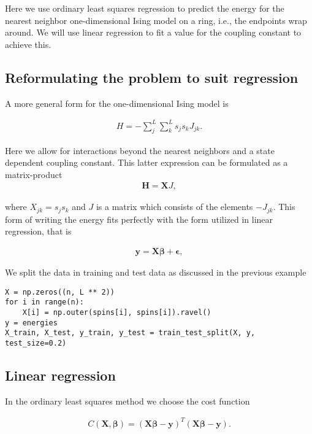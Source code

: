 \documentclass[%
oneside,                 %
final,                   %
10pt]{article}
\begin{document}
Here we use ordinary least squares
regression to predict the energy for the nearest neighbor
one-dimensional Ising model on a ring, i.e., the endpoints wrap
around. We will use linear regression to fit a value for
the coupling constant to achieve this.

\subsection*{Reformulating the problem to suit regression}

A more general form for the one-dimensional Ising model is

\begin{align}
    H = - \sum_j^L \sum_k^L s_j s_k J_{jk}.
\end{align}

Here we allow for interactions beyond the nearest neighbors and a state dependent
coupling constant. This latter expression can be formulated as
a matrix-product
\begin{align}
    \bm{H} = \bm{X} J,
\end{align}

where $X_{jk} = s_j s_k$ and $J$ is a matrix which consists of the
elements $-J_{jk}$. This form of writing the energy fits perfectly
with the form utilized in linear regression, that is

\begin{align}
    \bm{y} = \bm{X}\bm{\beta} + \bm{\epsilon},
\end{align}

We split the data in training and test data as discussed in the previous example

\begin{verbatim}
X = np.zeros((n, L ** 2))
for i in range(n):
    X[i] = np.outer(spins[i], spins[i]).ravel()
y = energies
X_train, X_test, y_train, y_test = train_test_split(X, y, test_size=0.2)
\end{verbatim}

\subsection*{Linear regression}

In the ordinary least squares method we choose the cost function

\begin{align}
    C(\bm{X}, \bm{\beta})= (\bm{X}\bm{\beta} - \bm{y})^T(\bm{X}\bm{\beta} - \bm{y}).
\end{align}
\end{document}
